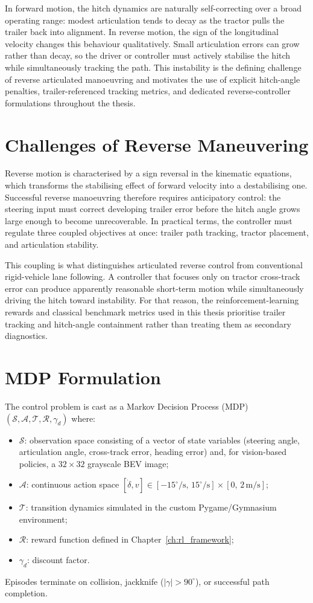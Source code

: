 In forward motion, the hitch dynamics are naturally self-correcting over a broad operating range: modest articulation tends to decay as the tractor pulls the trailer back into alignment. In reverse motion, the sign of the longitudinal velocity changes this behaviour qualitatively. Small articulation errors can grow rather than decay, so the driver or controller must actively stabilise the hitch while simultaneously tracking the path. This instability is the defining challenge of reverse articulated manoeuvring and motivates the use of explicit hitch-angle penalties, trailer-referenced tracking metrics, and dedicated reverse-controller formulations throughout the thesis.

\section{Challenges of Reverse Maneuvering}

Reverse motion is characterised by a sign reversal in the kinematic equations, which transforms the stabilising effect of forward velocity into a destabilising one. Successful reverse manoeuvring therefore requires anticipatory control: the steering input must correct developing trailer error before the hitch angle grows large enough to become unrecoverable. In practical terms, the controller must regulate three coupled objectives at once: trailer path tracking, tractor placement, and articulation stability.

This coupling is what distinguishes articulated reverse control from conventional rigid-vehicle lane following. A controller that focuses only on tractor cross-track error can produce apparently reasonable short-term motion while simultaneously driving the hitch toward instability. For that reason, the reinforcement-learning rewards and classical benchmark metrics used in this thesis prioritise trailer tracking and hitch-angle containment rather than treating them as secondary diagnostics.

\section{MDP Formulation}

The control problem is cast as a Markov Decision Process (MDP) $(\mathcal{S}, \mathcal{A}, \mathcal{T}, \mathcal{R}, \gamma_d)$ where:

\begin{itemize}
    \item $\mathcal{S}$: observation space consisting of a vector of state variables (steering angle, articulation angle, cross-track error, heading error) and, for vision-based policies, a $32\times32$ grayscale BEV image;
    \item $\mathcal{A}$: continuous action space $[\dot{\delta}, v] \in [-15^\circ/\text{s},\, 15^\circ/\text{s}] \times [0,\, 2\,\text{m/s}]$;
    \item $\mathcal{T}$: transition dynamics simulated in the custom Pygame/Gymnasium environment;
    \item $\mathcal{R}$: reward function defined in Chapter~\ref{ch:rl_framework};
    \item $\gamma_d$: discount factor.
\end{itemize}

Episodes terminate on collision, jackknife ($|\gamma| > 90^\circ$), or successful path completion.

